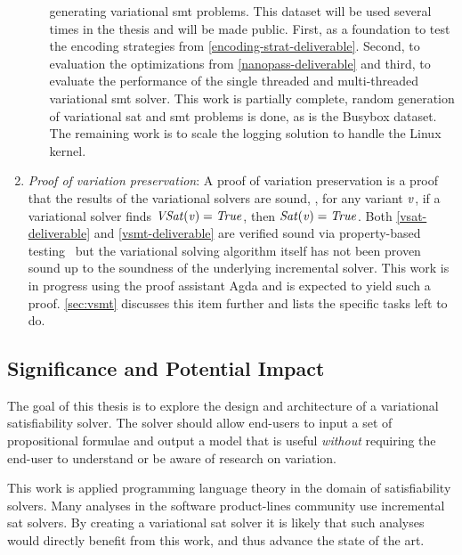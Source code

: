 \begin{enumerate}
\begin{enumerate}
    generating variational \ac{smt} problems. This dataset will be used several
    times in the thesis and will be made public. First, as a foundation to test
    the encoding strategies from \autoref{encoding-strat-deliverable}. Second,
    to evaluation the optimizations from \autoref{nanopass-deliverable} and
    third, to evaluate the performance of the single threaded and multi-threaded
    variational \ac{smt} solver. This work is partially complete, random
    generation of variational \ac{sat} and \ac{smt} problems is done, as is the
    Busybox dataset. The remaining work is to scale the logging solution to
    handle the Linux kernel.
  \end{enumerate}

\item \label{proof-deliverable} \textit{Proof of variation preservation}: A
  proof of variation preservation is a proof that the results of the variational
  solvers are sound, \ie{}, for any variant $\mathit{v}$, if a variational solver
  finds $\mathit{VSat(v)} = \mathit{True}$, then $\mathit{Sat(v)} = \mathit{True}$. Both
  \autoref{vsat-deliverable} and \autoref{vsmt-deliverable} are verified sound
  via property-based testing~\cite{10.1145/351240.351266} but the variational
  solving algorithm itself has not been proven sound up to the soundness of the
  underlying incremental solver. This work is in progress using the proof
  assistant Agda\cite{10.1145/2841316} and is expected to yield such a proof.
  \autoref{sec:vsmt} discusses this item further and lists the specific tasks
  left to do.
\end{enumerate}

\subsection{Significance and Potential Impact}%
\label{sec:sign-potent-impact}
The goal of this thesis is to explore the design and architecture of a
variational satisfiability solver. The solver should allow end-users to input a
set of propositional formulae and output a model that is useful \emph{without}
requiring the end-user to understand or be aware of research on variation.

This work is applied programming language theory in the domain of satisfiability
solvers. Many analyses in the software product-lines community use incremental
\ac{sat} solvers. By creating a variational \ac{sat} solver it is likely that
such analyses would directly benefit from this work, and thus advance the state
of the art.

